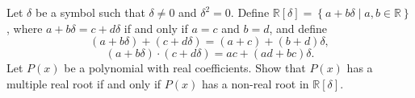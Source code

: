 Let $\delta$ be a symbol such that $\delta\neq 0$ and $\delta^2=0$. Define $\mathbb{R}\left[\delta\right]=\left\{a+b\delta\mid a,b\in\mathbb{R}\right\}$, where $a+b\delta=c+d\delta$ if and only if $a=c$ and $b=d$, and define \[\left(a+b\delta\right)+\left(c+d\delta\right)=\left(a+c\right)+\left(b+d\right)\delta,\]\[\left(a+b\delta\right)\cdot\left(c+d\delta\right)=ac+\left(ad+bc\right)\delta.\] Let $P\left(x\right)$ be a polynomial with real coefficients. Show that $P\left(x\right)$ has a multiple real root if and only if $P\left(x\right)$ has a non-real root in $\mathbb{R}\left[\delta\right]$.